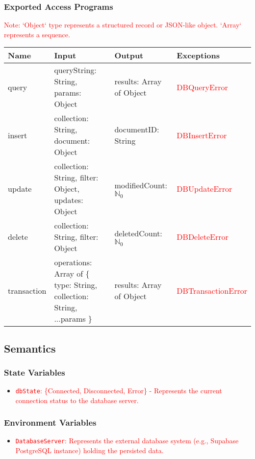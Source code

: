 \documentclass[12pt, titlepage]{article}
\begin{document}
\subsubsection{Exported Access Programs}
\textcolor{red}{Note: `Object` type represents a structured record or JSON-like object. `Array` represents a sequence.}
\begin{center}
    \scriptsize
    \begin{tabular}{|p{3cm}|p{4cm}|p{4cm}|p{4cm}|}
        \hline
        \textbf{Name} & \textbf{Input} & \textbf{Output} & \textbf{Exceptions} \\
        \hline
        query & queryString: String, params: Object & results: Array of Object & \textcolor{red}{DBQueryError} \\
        \hline
        insert & collection: String, document: Object & documentID: String & \textcolor{red}{DBInsertError} \\
        \hline
        update & collection: String, filter: Object, updates: Object & modifiedCount: $\mathbb{N}_0$ & \textcolor{red}{DBUpdateError} \\
        \hline
        delete & collection: String, filter: Object & deletedCount: $\mathbb{N}_0$ & \textcolor{red}{DBDeleteError} \\
        \hline
        transaction & operations: Array of \newline \{ type: String, \newline collection: String, \newline ...params \} & results: Array of Object & \textcolor{red}{DBTransactionError} \\
        \hline
    \end{tabular}
\end{center}

\subsection{Semantics}
\subsubsection{State Variables}
\begin{itemize}
    \item \textcolor{red}{\texttt{dbState}: \{Connected, Disconnected, Error\} - Represents the current connection status to the database server.}
\end{itemize}

\subsubsection{Environment Variables}
\begin{itemize}
    \item \textcolor{red}{\texttt{DatabaseServer}: Represents the external database system (e.g., Supabase PostgreSQL instance) holding the persisted data.}
\end{itemize}
\end{document}
